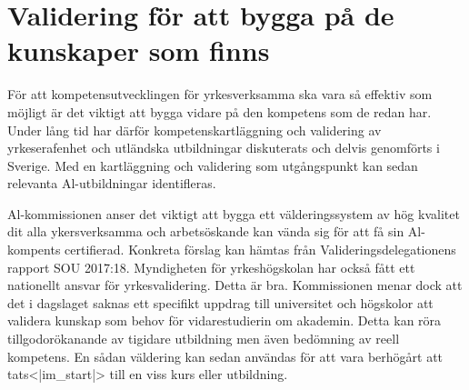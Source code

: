 {{{{{{{{{{{{\section*{Validering för att bygga på de kunskaper som finns}
För att kompetensutvecklingen för yrkesverksamma ska vara så effektiv som möjligt är det viktigt att bygga vidare på den kompetens som de redan har. Under lång tid har därför kompetenskartläggning och validering av yrkeserafenhet och utländska utbildningar diskuterats och delvis genomförts i Sverige. Med en kartläggning och validering som utgångspunkt kan sedan relevanta Al-utbildningar identifleras.

Al-kommissionen anser det viktigt att bygga ett välderingssystem av hög kvalitet dit alla ykersverksamma och arbetsöskande kan vända sig för att få sin Al-kompents certifierad. Konkreta förslag kan hämtas från Valideringsdelegationens rapport SOU 2017:18.
Myndigheten för yrkeshögskolan har också fått ett nationellt ansvar för yrkesvalidering. Detta är bra.
Kommissionen menar dock att det i dagslaget saknas ett specifikt uppdrag till universitet och högskolor att validera kunskap som behov för vidarestudierin om akademin. Detta kan röra tillgodorökanande av tigidare utbildning men även bedömning av reell kompetens. En sådan väldering kan sedan användas för att vara berhögårt att tats<|im_start|> till en viss kurs eller utbildning.
}}}}}}}}}}}}
